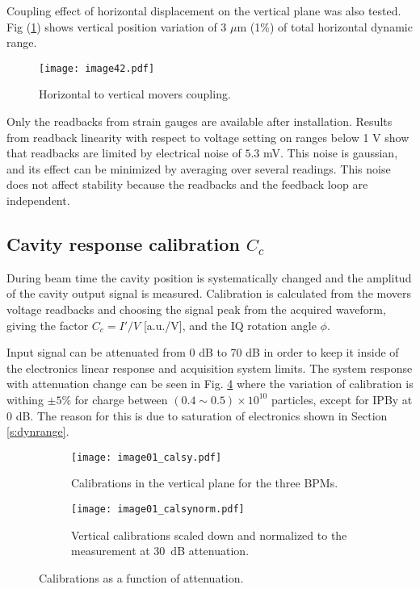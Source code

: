 Coupling effect of horizontal displacement on the vertical plane was also tested. Fig (\ref{f:PIcoupling}) shows vertical position variation of 3 $\mu$m (1\%) of total horizontal dynamic range.\par
\begin{figure}[!htb]
\centering
\texttt{[image: image42.pdf]}\caption{Horizontal to vertical movers coupling.}\label{f:PIcoupling}
\end{figure}
Only the readbacks from strain gauges are available after installation. Results from readback linearity with respect to voltage setting on ranges below 1 V show that readbacks are limited by electrical noise of $5.3$ mV. This noise is gaussian, and its effect can be minimized by averaging over several readings. This noise does not affect stability because the readbacks and the feedback loop are independent.

\subsection{Cavity response calibration $C_c$}\label{s:calibration}
During beam time the cavity position is systematically changed and the amplitud of the cavity output signal is measured. Calibration is calculated from the movers voltage readbacks and choosing the signal peak from the acquired waveform,  giving the factor $C_c=I'/V$ [a.u./V], and the IQ rotation angle $\phi$.\par
Input signal can be attenuated from 0 dB to 70 dB in order to keep it inside of the electronics linear response and acquisition system limits. The system response with attenuation change can be seen in Fig. \ref{f:calatt} where the variation of calibration is withing $\pm5\%$ for charge between $(0.4\sim0.5)\times10^{10}$ particles, except for IPBy at 0 dB. The reason for this is due to saturation of electronics shown in Section \ref{s:dynrange}.
\begin{figure}[!htb]
 \centering\hspace*{-0.6cm}
 \begin{subfigure}{0.4\textwidth}
  \texttt{[image: image01\_calsy.pdf]}\caption{Calibrations in the vertical plane for the three BPMs.}\label{f:calsy}
 \end{subfigure}\hspace*{1cm}
\begin{subfigure}{0.4\textwidth}
  \texttt{[image: image01\_calsynorm.pdf]}\caption{Vertical calibrations scaled down and normalized to the measurement at 30~dB attenuation.}\label{f:calsynorm}
 \end{subfigure}\caption{Calibrations as a function of attenuation.}\label{f:calatt}
\end{figure}

